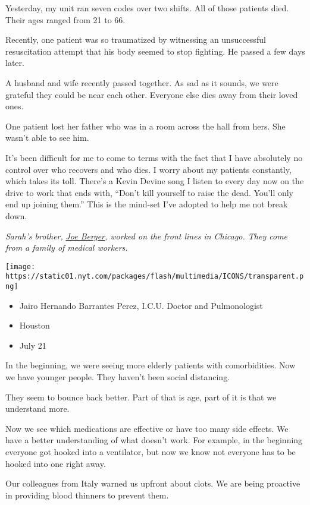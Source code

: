 Yesterday, my unit ran seven codes over two shifts. All of those
patients died. Their ages ranged from 21 to 66.

Recently, one patient was so traumatized by witnessing an unsuccessful
resuscitation attempt that his body seemed to stop fighting. He passed a
few days later.

A husband and wife recently passed together. As sad as it sounds, we
were grateful they could be near each other. Everyone else dies away
from their loved ones.

One patient lost her father who was in a room across the hall from hers.
She wasn't able to see him.

It's been difficult for me to come to terms with the fact that I have
absolutely no control over who recovers and who dies. I worry about my
patients constantly, which takes its toll. There's a Kevin Devine song I
listen to every day now on the drive to work that ends with, ``Don't
kill yourself to raise the dead. You'll only end up joining them.'' This
is the mind-set I've adopted to help me not break down.

\emph{Sarah's brother,}
\emph{\href{https://www.nytimes.com/interactive/2020/world/coronavirus-health-care-workers.html\#item-joe-berger}{Joe
Berger}, worked on the front lines in Chicago. They come from a family
of medical workers.}

\texttt{[image: https://static01.nyt.com/packages/flash/multimedia/ICONS/transparent.png]}

\begin{itemize}
\tightlist
\item
  Jairo Hernando Barrantes Perez, I.C.U. Doctor and Pulmonologist
\item
  Houston
\item
  July 21
\end{itemize}

In the beginning, we were seeing more elderly patients with
comorbidities. Now we have younger people. They haven't been social
distancing.

They seem to bounce back better. Part of that is age, part of it is that
we understand more.

Now we see which medications are effective or have too many side
effects. We have a better understanding of what doesn't work. For
example, in the beginning everyone got hooked into a ventilator, but now
we know not everyone has to be hooked into one right away.

Our colleagues from Italy warned us upfront about clots. We are being
proactive in providing blood thinners to prevent them.

